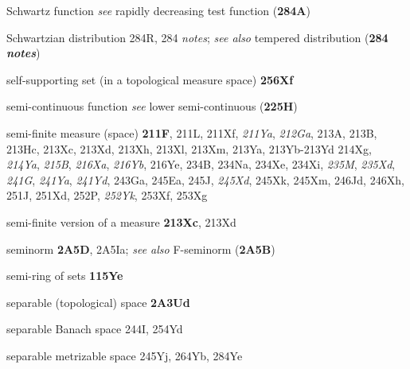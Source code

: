 Schwartz function {\it see} rapidly decreasing test function
({\bf 284A})


Schwartzian distribution 284R, 284 {\it notes};
  {\it see also} tempered distribution ({\bf 284 {\it notes}})




















self-supporting set (in a topological measure space)
{\bf 256Xf}









semi-continuous function
  {\it see} lower semi-continuous ({\bf 225H})






semi-finite measure (space) {\bf 211F}, 211L, 211Xf, {\it 211Ya},
{\it 212Ga}, 213A, 213B, 213Hc, 213Xc, 213Xd, 213Xh, 213Xl, 213Xm,
213Ya, 213Yb-213Yd 
214Xg, {\it 214Ya}, {\it 215B},
{\it 216Xa}, {\it 216Yb}, 216Ye, 234B, 234Na, 234Xe, 234Xi,
{\it 235M}, {\it 235Xd}, {\it 241G}, {\it 241Ya}, {\it 241Yd},
243Ga, 245Ea, 245J, {\it 245Xd}, 245Xk, 245Xm, 246Jd,
246Xh, 251J, 251Xd, 252P, {\it 252Yk}, 253Xf, 253Xg


semi-finite version of a measure {\bf 213Xc}, 213Xd





seminorm {\bf 2A5D}, 2A5Ia;  
{\it see also} F-seminorm ({\bf 2A5B})





semi-ring of sets {\bf 115Ye}



separable (topological) space {\bf 2A3Ud}


separable Banach space 244I, 254Yd




separable metrizable space 245Yj, 264Yb, 284Ye






